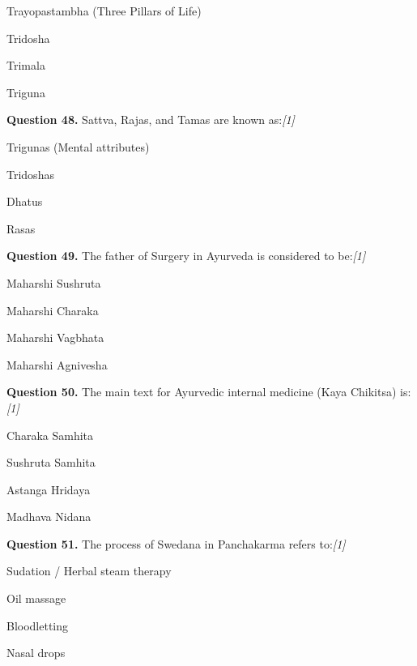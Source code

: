 \documentclass[11pt,a4paper]{article}
\newcommand{\pts}[1]{\hfill   \textit{[#1]}}
\begin{document}
\begin{parts}
  \item Trayopastambha (Three Pillars of Life)
  \item Tridosha
  \item Trimala
  \item Triguna
\end{parts}

\medskip




\noindent   \textbf{Question 48.} Sattva, Rajas, and Tamas are known as:\pts{1}

\begin{parts}
  \item Trigunas (Mental attributes)
  \item Tridoshas
  \item Dhatus
  \item Rasas
\end{parts}

\medskip




\noindent   \textbf{Question 49.} The father of Surgery in Ayurveda is considered to be:\pts{1}

\begin{parts}
  \item Maharshi Sushruta
  \item Maharshi Charaka
  \item Maharshi Vagbhata
  \item Maharshi Agnivesha
\end{parts}

\medskip




\noindent   \textbf{Question 50.} The main text for Ayurvedic internal medicine (Kaya Chikitsa) is:\pts{1}

\begin{parts}
  \item Charaka Samhita
  \item Sushruta Samhita
  \item Astanga Hridaya
  \item Madhava Nidana
\end{parts}

\medskip




\noindent   \textbf{Question 51.} The process of Swedana in Panchakarma refers to:\pts{1}

\begin{parts}
  \item Sudation / Herbal steam therapy
  \item Oil massage
  \item Bloodletting
  \item Nasal drops
\end{parts}
\end{document}
